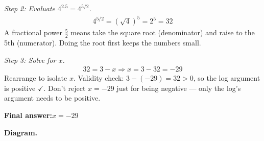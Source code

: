 \documentclass[11pt]{article}
\begin{document}
\textit{Step 2: Evaluate \( 4^{2.5} = 4^{5/2} \).}
\[\begin{gathered}
4^{5/2} = (\sqrt{4})^5 = 2^5 = 32
\end{gathered}\]
A fractional power \( \tfrac{5}{2} \) means take the square root (denominator) and raise to the 5th (numerator). Doing the root first keeps the numbers small.

\textit{Step 3: Solve for \( x \).}
\[\begin{gathered}
32 = 3 - x \Rightarrow x = 3 - 32 = -29
\end{gathered}\]
Rearrange to isolate \( x \). Validity check: \( 3 - (-29) = 32 > 0 \), so the log argument is positive $\checkmark$. Don't reject \( x = -29 \) just for being negative --- only the log's argument needs to be positive.

\begin{answerbox}
\textbf{Final answer:}\quad \(\displaystyle  x = -29 \)
\end{answerbox}
\textbf{Diagram.}
\end{document}
